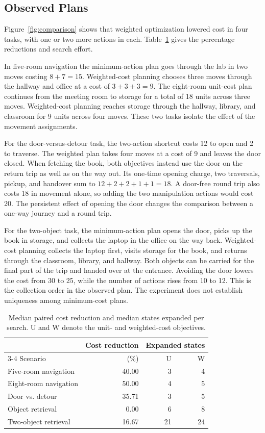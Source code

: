 \documentclass[conference,a4paper]{IEEEtran}
\theoremstyle{plain}
\theoremstyle{definition}
\theoremstyle{remark}
\begin{document}
\subsection{Observed Plans}
Figure~\ref{fig:comparison} shows that weighted optimization lowered cost in four tasks, with one or two more actions in each. Table~\ref{tab:effort} gives the percentage reductions and search effort.

In five-room navigation the minimum-action plan goes through the lab in two moves costing $8+7=15$. Weighted-cost planning chooses three moves through the hallway and office at a cost of $3+3+3=9$. The eight-room unit-cost plan continues from the meeting room to storage for a total of 18 units across three moves. Weighted-cost planning reaches storage through the hallway, library, and classroom for 9 units across four moves. These two tasks isolate the effect of the movement assignments.

For the door-versus-detour task, the two-action shortcut costs 12 to open and 2 to traverse. The weighted plan takes four moves at a cost of 9 and leaves the door closed. When fetching the book, both objectives instead use the door on the return trip as well as on the way out. Its one-time opening charge, two traversals, pickup, and handover sum to $12+2+2+1+1=18$. A door-free round trip also costs 18 in movement alone, so adding the two manipulation actions would cost 20. The persistent effect of opening the door changes the comparison between a one-way journey and a round trip.

For the two-object task, the minimum-action plan opens the door, picks up the book in storage, and collects the laptop in the office on the way back. Weighted-cost planning collects the laptop first, visits storage for the book, and returns through the classroom, library, and hallway. Both objects can be carried for the final part of the trip and handed over at the entrance. Avoiding the door lowers the cost from 30 to 25, while the number of actions rises from 10 to 12. This is the collection order in the observed plan. The experiment does not establish uniqueness among minimum-cost plans.

\begin{table}[t]
\caption{Median paired cost reduction and median states expanded per search. U and W denote the unit- and weighted-cost objectives.}
\label{tab:effort}
\centering
\begin{tabular}{@{}lrrr@{}}
\toprule
 & Cost reduction & \multicolumn{2}{c}{Expanded states} \\
\cmidrule(l){3-4}
Scenario & (\%) & U & W \\
\midrule
Five-room navigation & 40.00 & 3 & 4 \\
Eight-room navigation & 50.00 & 4 & 5 \\
Door vs. detour & 35.71 & 3 & 5 \\
Object retrieval & 0.00 & 6 & 8 \\
Two-object retrieval & 16.67 & 21 & 24 \\
\bottomrule
\end{tabular}
\end{table}
\end{document}
